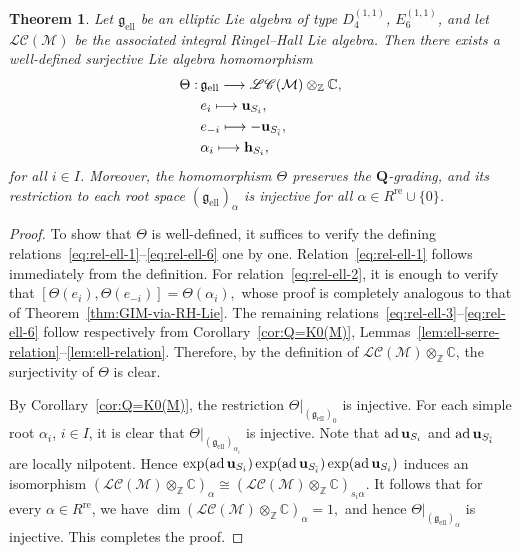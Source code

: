 \documentclass[12pt,reqno]{amsart}
\numberwithin{equation}{section}
\renewcommand{\dim}{\operatorname{dim}\nolimits}
\newtheorem{theorem}{Theorem}[section]
\begin{document}
	\begin{theorem}\label{thm:relization-ell-Lie}
		Let $\mathfrak{g}_{\mathrm{ell}}$ be an elliptic Lie algebra of type $D_4^{(1,1)}$, $E_6^{(1,1)}$,  and let $\mathscr{LC}(\mathcal{M})$ be the associated integral Ringel--Hall Lie algebra. Then there exists a well-defined surjective Lie algebra homomorphism
		\begin{align*}
			\Theta:\,&\mathfrak{g}_{\mathrm{ell}} \longrightarrow \mathscr{LC}(\mathcal{M})\otimes_{\mathbb{Z}}\mathbb{C},\\
			&e_i \longmapsto {\bf u}_{S_i},\\
			&e_{-i} \longmapsto -{\bf u}_{ S_{\bar i}},\\
			&\alpha_i \longmapsto {\bf h}_{S_i},
		\end{align*}
		for all $i\in I$.
		Moreover, the homomorphism $\Theta$ preserves the $\mathbf{Q}$-grading, and its restriction to each root space $(\mathfrak{g}_{\mathrm{ell}})_\alpha$ is injective for all $\alpha\in R^{\mathrm{re}}\cup\{0\}$.
	\end{theorem}
	
	\begin{proof}
		To show that $\Theta$ is well-defined, it suffices to verify the defining relations~\eqref{eq:rel-ell-1}--\eqref{eq:rel-ell-6} one by one. Relation~\eqref{eq:rel-ell-1} follows immediately from the definition. For relation~\eqref{eq:rel-ell-2}, it is enough to verify that
		$[\Theta(e_i),\Theta(e_{-i})]=\Theta(\alpha_i),$
		whose proof is completely analogous to that of Theorem~\ref{thm:GIM-via-RH-Lie}. The remaining relations~\eqref{eq:rel-ell-3}--\eqref{eq:rel-ell-6} follow respectively from Corollary~\ref{cor:Q=K0(M)}, Lemmas~\ref{lem:ell-serre-relation}--\ref{lem:ell-relation}. Therefore, by the definition of $\mathscr{LC}(\mathcal{M})\otimes_{\mathbb{Z}}\mathbb{C}$, the surjectivity of $\Theta$ is clear.
		
		By Corollary~\ref{cor:Q=K0(M)}, the restriction $\Theta|_{(\mathfrak{g}_{\mathrm{ell}})_0}$ is injective. For each simple root $\alpha_i$, $i\in I$, it is clear that $\Theta|_{(\mathfrak{g}_{\mathrm{ell}})_{\alpha_i}}$ is injective. Note that $\operatorname{ad} {\bf u}_{S_i}$ and $\operatorname{ad} {\bf u}_{ S_{\bar i}}$ are locally nilpotent. Hence
		$\operatorname{exp}(\operatorname{ad} {\bf u}_{ S_i})
		\operatorname{exp}(\operatorname{ad} {\bf u}_{S_{\bar i}})
		\operatorname{exp}(\operatorname{ad} {\bf u}_{ S_{ i}})$
		induces an isomorphism
		$(\mathscr{LC}(\mathcal{M})\otimes_{\mathbb{Z}}\mathbb{C})_\alpha
		\cong
		(\mathscr{LC}(\mathcal{M})\otimes_{\mathbb{Z}}\mathbb{C})_{s_i\alpha}.$
		It follows that for every $\alpha\in R^{\mathrm{re}}$, we have
		$\dim (\mathscr{LC}(\mathcal{M})\otimes_{\mathbb{Z}}\mathbb{C})_\alpha=1,$
		and hence $\Theta|_{(\mathfrak{g}_{\mathrm{ell}})_\alpha}$ is injective. This completes the proof.
	\end{proof}
	
\end{document}

